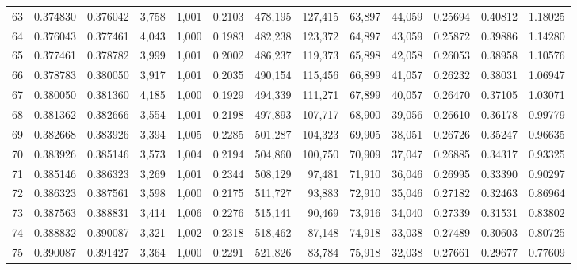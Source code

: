 \begin{tabular}{rrrrrrrrrrrrr}
63  &  0.374830 &  0.376042 &   3,758 &  1,001 &                                     0.2103 &  478,195 &  127,415 &   63,897 &   44,059 &  0.25694 &  0.40812 &  1.18025 \\
64  &  0.376043 &  0.377461 &   4,043 &  1,000 &                                     0.1983 &  482,238 &  123,372 &   64,897 &   43,059 &  0.25872 &  0.39886 &  1.14280 \\
65  &  0.377461 &  0.378782 &   3,999 &  1,001 &                                     0.2002 &  486,237 &  119,373 &   65,898 &   42,058 &  0.26053 &  0.38958 &  1.10576 \\
66  &  0.378783 &  0.380050 &   3,917 &  1,001 &                                     0.2035 &  490,154 &  115,456 &   66,899 &   41,057 &  0.26232 &  0.38031 &  1.06947 \\
67  &  0.380050 &  0.381360 &   4,185 &  1,000 &                                     0.1929 &  494,339 &  111,271 &   67,899 &   40,057 &  0.26470 &  0.37105 &  1.03071 \\
68  &  0.381362 &  0.382666 &   3,554 &  1,001 &                                     0.2198 &  497,893 &  107,717 &   68,900 &   39,056 &  0.26610 &  0.36178 &  0.99779 \\
69  &  0.382668 &  0.383926 &   3,394 &  1,005 &                                     0.2285 &  501,287 &  104,323 &   69,905 &   38,051 &  0.26726 &  0.35247 &  0.96635 \\
70  &  0.383926 &  0.385146 &   3,573 &  1,004 &                                     0.2194 &  504,860 &  100,750 &   70,909 &   37,047 &  0.26885 &  0.34317 &  0.93325 \\
71  &  0.385146 &  0.386323 &   3,269 &  1,001 &                                     0.2344 &  508,129 &   97,481 &   71,910 &   36,046 &  0.26995 &  0.33390 &  0.90297 \\
72  &  0.386323 &  0.387561 &   3,598 &  1,000 &                                     0.2175 &  511,727 &   93,883 &   72,910 &   35,046 &  0.27182 &  0.32463 &  0.86964 \\
73  &  0.387563 &  0.388831 &   3,414 &  1,006 &                                     0.2276 &  515,141 &   90,469 &   73,916 &   34,040 &  0.27339 &  0.31531 &  0.83802 \\
74  &  0.388832 &  0.390087 &   3,321 &  1,002 &                                     0.2318 &  518,462 &   87,148 &   74,918 &   33,038 &  0.27489 &  0.30603 &  0.80725 \\
75  &  0.390087 &  0.391427 &   3,364 &  1,000 &                                     0.2291 &  521,826 &   83,784 &   75,918 &   32,038 &  0.27661 &  0.29677 &  0.77609 \\

\end{tabular}
